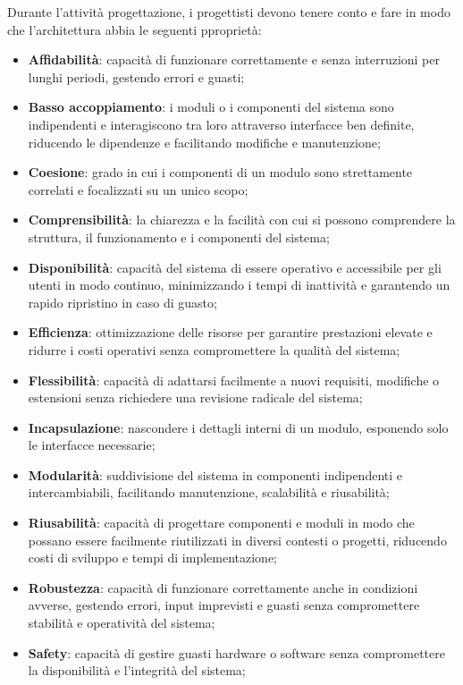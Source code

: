 Durante l'attività progettazione, i progettisti devono tenere conto e fare in modo che l'architettura abbia le seguenti pproprietà:
\begin{itemize}
    \item \textbf{Affidabilità}: capacità di funzionare correttamente e senza interruzioni per lunghi periodi, gestendo errori e guasti;
    \item \textbf{Basso accoppiamento}: i moduli o i componenti del sistema sono indipendenti e interagiscono tra loro attraverso interfacce ben definite, riducendo le dipendenze e facilitando modifiche e manutenzione;
    \item \textbf{Coesione}: grado in cui i componenti di un modulo sono strettamente correlati e focalizzati su un unico scopo;
    \item \textbf{Comprensibilità}: la chiarezza e la facilità con cui si possono comprendere la struttura, il funzionamento e i componenti del sistema;
    \item \textbf{Disponibilità}: capacità del sistema di essere operativo e accessibile per gli utenti in modo continuo, minimizzando i tempi di inattività e garantendo un rapido ripristino in caso di guasto;
    \item \textbf{Efficienza}: ottimizzazione delle risorse per garantire prestazioni elevate e ridurre i costi operativi senza compromettere la qualità del sistema;
    \item \textbf{Flessibilità}: capacità di adattarsi facilmente a nuovi requisiti, modifiche o estensioni senza richiedere una revisione radicale del sistema;
    \item \textbf{Incapsulazione}: nascondere i dettagli interni di un modulo, esponendo solo le interfacce necessarie;
    \item \textbf{Modularità}: suddivisione del sistema in componenti indipendenti e intercambiabili, facilitando manutenzione, scalabilità e riusabilità;
    \item \textbf{Riusabilità}: capacità di progettare componenti e moduli in modo che possano essere facilmente riutilizzati in diversi contesti o progetti, riducendo costi di sviluppo e tempi di implementazione;
    \item \textbf{Robustezza}: capacità di funzionare correttamente anche in condizioni avverse, gestendo errori, input imprevisti e guasti senza compromettere stabilità e operatività del sistema;
    \item \textbf{Safety}: capacità di gestire guasti hardware o software senza compromettere la disponibilità e l'integrità del sistema;

\end{itemize}
